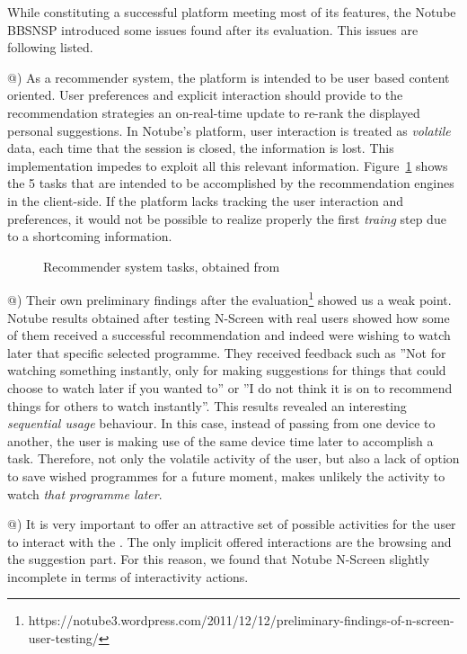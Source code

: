 \documentclass{acm_proc_article-sp}
\makeatletter
\newcommand*{\rom}[1]{\expandafter\@slowromancap\romannumeral #1@}
\makeatother
\begin{document}
While constituting a successful platform meeting most of its features, the Notube BBSNSP introduced some issues found after its evaluation. This issues are following listed. 

\rom{1}) As a recommender system, the platform is intended to be user based content oriented. User preferences and explicit interaction should provide to the recommendation strategies an on-real-time update to re-rank the displayed personal suggestions\cite{libbyrecommender}. In Notube's platform, user interaction is treated as \textit{volatile} data, each time that the session is closed, the information is lost. This implementation impedes to exploit all this relevant information. Figure~\ref{fig:recomm} shows the 5 tasks that are intended to be accomplished by the recommendation engines in the client-side. If the platform lacks tracking the user interaction and preferences, it would not be possible to realize properly the first \textit{traing} step due to a shortcoming information.

\begin{figure}[!htb]
\centering
{}
\caption{Recommender system tasks, obtained from \cite{libbyrecommender}}
\label{fig:recomm}
\end{figure}

\rom{2}) Their own preliminary findings after the evaluation\footnote{https://notube3.wordpress.com/2011/12/12/preliminary-findings-of-n-screen-user-testing/} showed us a weak point. Notube results obtained after testing N-Screen with real users showed how some of them received a successful recommendation and indeed were wishing to watch later that specific selected programme. They received feedback such as ''Not for watching something instantly, only for making suggestions for things that could choose to watch later if you wanted to'' or ''I do not think it is on to recommend things for others to watch instantly''. This results revealed an interesting \textit{sequential usage} behaviour. In this case, instead of passing from one device to another, the user is making use of the same device time later to accomplish a task. Therefore, not only the volatile activity of the user, but also a lack of option to save wished programmes for a future moment, makes unlikely the activity to watch \textit{that programme later}. 

\rom{3}) It is very important to offer an attractive set of possible activities for the user to interact with the \cite{skadberg2004visitors}. The only implicit offered interactions are the browsing and the suggestion part. For this reason, we found that Notube N-Screen slightly incomplete in terms of interactivity actions. 
\end{document}
